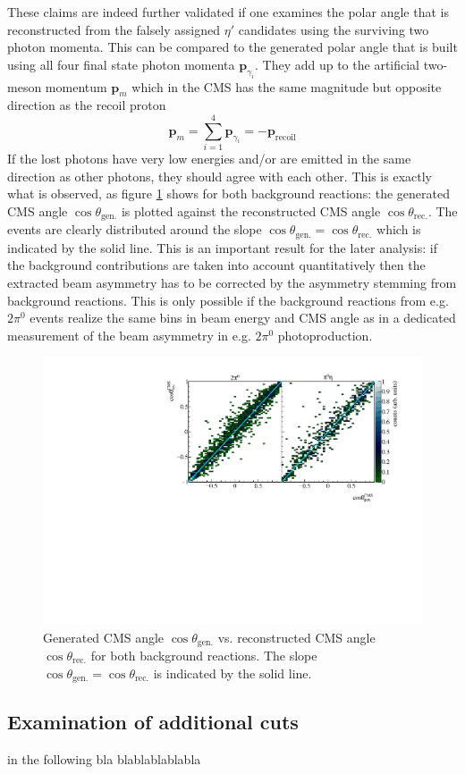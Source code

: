 These claims are indeed further validated if one examines the polar angle that is reconstructed from the falsely assigned $\eta'$ candidates using the surviving two photon momenta. This can be compared to the generated polar angle that is built using all four final state photon momenta $\mathbf{p}_{\gamma_i}$. They add up to the artificial two-meson momentum $\mathbf{p}_m$ which in the CMS has the same magnitude but opposite direction as the recoil proton
$$
	\mathbf{p}_m=\sum_{i=1}^4\mathbf{p}_{\gamma_i}=-\mathbf{p}_\text{recoil}
$$ If the lost photons have very low energies and/or are emitted in the same direction as other photons, they should agree with each other. This is exactly what is observed, as figure \ref{fig:mccostheta} shows for both background reactions: the generated CMS angle $\cos\theta_\text{gen.}$ is plotted against the reconstructed CMS angle $\cos\theta_\text{rec.}$. The events are clearly distributed around the slope $\cos\theta_\text{gen.}=\cos\theta_\text{rec.}$ which is indicated by the solid line. This is an important result for the later analysis: if the background contributions are taken into account quantitatively then the extracted beam asymmetry has to be corrected by the asymmetry stemming from background reactions. This is only possible if the background reactions from e.g. $2\pi^0$ events realize the same bins in beam energy and CMS angle as in a dedicated measurement of the beam asymmetry in e.g. $2\pi^0$ photoproduction.
\begin{figure}[htbp]
	\centering
	\includegraphics[width=\linewidth]{../figs/hydrogen/mcgammas_ct.pdf}
	\caption{Generated CMS angle $\cos\theta_\text{gen.}$ vs. reconstructed CMS angle $\cos\theta_\text{rec.}$ for both background reactions. The slope $\cos\theta_\text{gen.}=\cos\theta_\text{rec.}$ is indicated by the solid line.}
	\label{fig:mccostheta}
\end{figure}


\subsection{Examination of additional cuts}
in the following bla blablablablabla 
